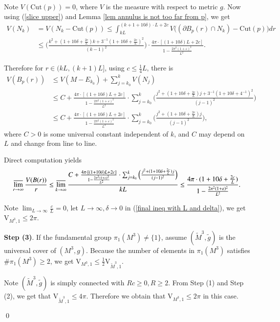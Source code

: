 \documentclass[11pt]{amsart}
\numberwithin{equation}{section}
\begin{document}
{Note $V(\mathrm{Cut}(p))= 0$, where $V$ is the measure with respect to metric $g$.  Now using (\ref{slice upper}) and Lemma \ref{lem annulus is not too far from p},  we get
\begin{align}
V(N_k)&= V(N_k- \mathrm{Cut}(p))\leq \int_{kL}^{(k+ 1+ 10\delta)\cdot L+ 2c} V\Big((\partial B_p(r)\cap N_k)- \mathrm{Cut}(p)\Big) dr  \nonumber \\
&\leq  \Big(\frac{k^2+ (1+ 10\delta+ \frac{2c}{L})k+ 3^{-1}(1+ 10\delta+ \frac{2c}{L})^2}{(k- 1)^2}\Big)\cdot \frac{4\pi\cdot [(1+ 10\delta)L+ 2c]}{1- \frac{2\pi^2(1+\varepsilon)^2}{L^2}}. \nonumber 
\end{align}

Therefore for $r\in (kL, (k+ 1)L]$,  using $c\leq \frac{1}{4}L$,  there is 
\begin{align}
V(B_p(r))&\leq V(M- E_{k_0})+ \sum_{j= k_0}^{k}V(N_j) \nonumber \\
&\leq C+ \frac{4\pi\cdot [(1+ 10\delta)L+ 2c]}{1- \frac{2\pi^2(1+\varepsilon)^2}{L^2}}\cdot \sum_{j= k_0}^{k}\Big(\frac{j^2+ (1+ 10\delta + \frac{2c}{L})j+ 3^{-1}(1+ 10\delta+ 4^{-1})^2}{(j- 1)^2}\Big) \nonumber \\
& \leq C+ \frac{4\pi\cdot [(1+ 10\delta)L+ 2c]}{1- \frac{2\pi^2(1+\varepsilon)^2}{L^2}}\cdot  \sum_{j= k_0}^{k}\Big(\frac{j^2+ (1+ 10\delta+ \frac{2c}{L})j}{(j- 1)^2}\Big), \nonumber 
\end{align}
where $C> 0$ is some universal constant independent of $k$,  and $C$ may depend on $L$ and change from line to line.

Direct computation yields
\begin{align}
\varlimsup_{r\rightarrow\infty} \frac{V(B(r))}{r}\leq \varlimsup_{k\rightarrow\infty}\frac{C+ \frac{4\pi\cdot [(1+ 10\delta)L+ 2c]}{1- \frac{2\pi^2(1+\varepsilon)^2}{L^2}}\cdot \sum_{j= k_0}^{k}\Big(\frac{j^2+ (1+ 10\delta+ \frac{2c}{L})j}{(j- 1)^2}\Big)}{kL}\leq \frac{4\pi\cdot (1+ 10\delta+ \frac{2c}{L})}{1- \frac{2\pi^2(1+\varepsilon)^2}{L^2}} . \label{final ineq with L and delta} 
\end{align}

Note $\displaystyle \lim_{L\rightarrow\infty}\frac{c}{L}= 0$,  let $L\rightarrow\infty,  \delta\rightarrow 0$ in (\ref{final ineq with L and delta}), we get $\displaystyle  \mathrm{V}_{M^3, 1}\leq 2\pi$.

\textbf{Step (3)}. If the fundamental group $\pi_1(M^3)\neq \{1\}$, assume $(\tilde{M}^3, \tilde{g})$ is the universal cover of $(M^3, g)$. Because the number of elements in $\pi_1(M^3)$ satisfies $\#\pi_1(M^3)\geq 2$, we get $\displaystyle  \mathrm{V}_{M^3, 1}\leq  \frac{1}{2}\mathrm{V}_{\tilde{M}^3, 1}$.

Note $(\tilde{M}^3, \tilde{g})$ is simply connected with $Rc\geq 0, R\geq 2$. From Step (1) and Step (2), we get that $\displaystyle \mathrm{V}_{\tilde{M}^3, 1}\leq 4\pi$. Therefore we obtain that $\displaystyle  \mathrm{V}_{M^3, 1}\leq 2\pi$ in this case. 
}
\qed
\end{document}
